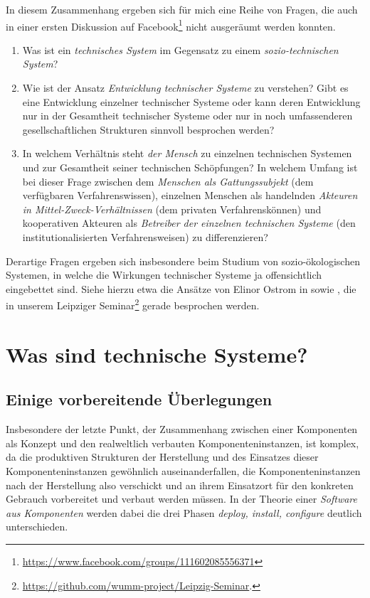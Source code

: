 \documentclass[11pt,a4paper]{article}
\begin{document}
In diesem Zusammenhang ergeben sich für mich eine Reihe von Fragen, die auch
in einer ersten Diskussion auf
Facebook\footnote{\url{https://www.facebook.com/groups/111602085556371}} nicht
ausgeräumt werden konnten.
\begin{enumerate}
\item Was ist ein \emph{technisches System} im Gegensatz zu einem
  \emph{sozio-technischen System}?
\item Wie ist der Ansatz \emph{Entwicklung technischer Systeme} zu verstehen?
  Gibt es eine Entwicklung einzelner technischer Systeme oder kann deren
  Entwicklung nur in der Gesamtheit technischer Systeme oder nur in noch
  umfassenderen gesellschaftlichen Strukturen sinnvoll besprochen werden?
\item In welchem Verhältnis steht \emph{der Mensch} zu einzelnen technischen
  Systemen und zur Gesamtheit seiner technischen Schöpfungen? In welchem
  Umfang ist bei dieser Frage zwischen dem \emph{Menschen als Gattungssubjekt}
  (dem verfügbaren Verfahrenswissen), einzelnen Menschen als handelnden
  \emph{Akteuren in Mittel-Zweck-Verhältnissen} (dem privaten
  Verfahrenskönnen) und kooperativen Akteuren als \emph{Betreiber der
    einzelnen technischen Systeme} (den institutionalisierten
  Verfahrensweisen) zu differenzieren?
\end{enumerate}

Derartige Fragen ergeben sich insbesondere beim Studium von sozio-ökologischen
Systemen, in welche die Wirkungen technischer Systeme ja offensichtlich
eingebettet sind.  Siehe hierzu etwa die Ansätze von Elinor Ostrom in
\cite{Anderies2004} sowie \cite{Ostrom2007}, die in unserem Leipziger
Seminar\footnote{\url{https://github.com/wumm-project/Leipzig-Seminar}.}
gerade besprochen werden.

\section{Was sind technische Systeme?}

\subsection{Einige vorbereitende Überlegungen}

Insbesondere der letzte Punkt, der Zusammenhang zwischen einer Komponenten als
Konzept und den realweltlich verbauten Komponenteninstanzen, ist komplex, da
die produktiven Strukturen der Herstellung und des Einsatzes dieser
Komponenteninstanzen gewöhnlich auseinanderfallen, die Komponenteninstanzen
nach der Herstellung also verschickt und an ihrem Einsatzort für den konkreten
Gebrauch vorbereitet und verbaut werden müssen. In der Theorie einer
\emph{Software aus Komponenten} werden dabei die drei Phasen \emph{deploy,
  install, configure} deutlich unterschieden. 
\end{document}
